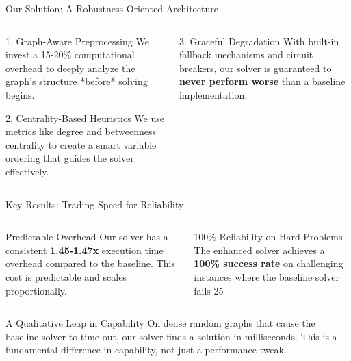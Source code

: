 \documentclass[11pt]{beamer}
\begin{document}
\begin{frame}{Our Solution: A Robustness-Oriented Architecture}
    \begin{columns}[T]
        \begin{column}{0.5\textwidth}
            \begin{alertblock}{1. Graph-Aware Preprocessing}
                We invest a 15-20\% computational overhead to deeply analyze the graph's structure *before* solving begins.
            \end{alertblock}
            \pause
            \begin{block}{2. Centrality-Based Heuristics}
                We use metrics like degree and betweenness centrality to create a smart variable ordering that guides the solver effectively.
            \end{block}
        \end{column}
        \begin{column}{0.5\textwidth}
            \pause
            \begin{exampleblock}{3. Graceful Degradation}
                With built-in fallback mechanisms and circuit breakers, our solver is guaranteed to \textbf{never perform worse} than a baseline implementation.
            \end{exampleblock}
        \end{column}
    \end{columns}
    \vfill
\end{frame}

\begin{frame}{Key Results: Trading Speed for Reliability}
    \begin{columns}[T]
        \begin{column}{0.5\textwidth}
            \begin{block}{Predictable Overhead}
                Our solver has a consistent \textbf{1.45-1.47x} execution time overhead compared to the baseline. This cost is predictable and scales proportionally.
            \end{block}
        \end{column}
        \begin{column}{0.5\textwidth}
            \begin{alertblock}{100\% Reliability on Hard Problems}
                The enhanced solver achieves a \textbf{100\% success rate} on challenging instances where the baseline solver fails 25%
            \end{alertblock}
        \end{column}
    \end{columns}
    \vfill
    \begin{exampleblock}{A Qualitative Leap in Capability}
        On dense random graphs that cause the baseline solver to time out, our solver finds a solution in milliseconds. This is a fundamental difference in capability, not just a performance tweak.
    \end{exampleblock}
\end{frame}
\end{document}
